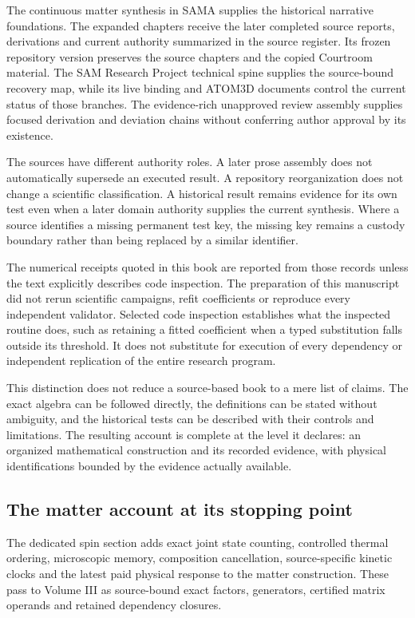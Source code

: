 The continuous matter synthesis in SAMA supplies the historical narrative foundations. The expanded chapters receive the later completed source reports, derivations and current authority summarized in the source register. Its frozen repository version preserves the source chapters and the copied Courtroom material. The SAM Research Project technical spine supplies the source-bound recovery map, while its live binding and ATOM3D documents control the current status of those branches. The evidence-rich unapproved review assembly supplies focused derivation and deviation chains without conferring author approval by its existence.\cite{viisama,viispine,viireview,viibinding,viiatom}

The sources have different authority roles. A later prose assembly does not automatically supersede an executed result. A repository reorganization does not change a scientific classification. A historical result remains evidence for its own test even when a later domain authority supplies the current synthesis. Where a source identifies a missing permanent test key, the missing key remains a custody boundary rather than being replaced by a similar identifier.

The numerical receipts quoted in this book are reported from those records unless the text explicitly describes code inspection. The preparation of this manuscript did not rerun scientific campaigns, refit coefficients or reproduce every independent validator. Selected code inspection establishes what the inspected routine does, such as retaining a fitted coefficient when a typed substitution falls outside its threshold. It does not substitute for execution of every dependency or independent replication of the entire research program.

This distinction does not reduce a source-based book to a mere list of claims. The exact algebra can be followed directly, the definitions can be stated without ambiguity, and the historical tests can be described with their controls and limitations. The resulting account is complete at the level it declares: an organized mathematical construction and its recorded evidence, with physical identifications bounded by the evidence actually available.

\subsection{The matter account at its stopping point}

The dedicated spin section adds exact joint state counting, controlled thermal ordering, microscopic memory, composition cancellation, source-specific kinetic clocks and the latest paid physical response to the matter construction. These pass to Volume III as source-bound exact factors, generators, certified matrix operands and retained dependency closures.

